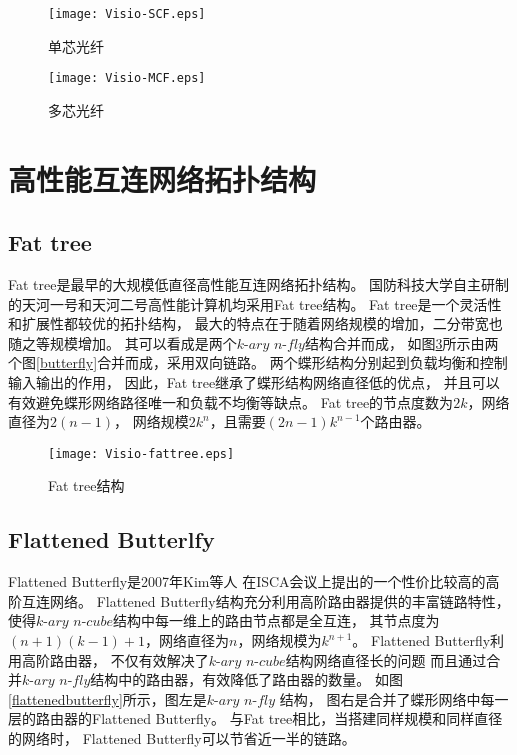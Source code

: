 \begin{figure}[htp]
  \centering
    \texttt{[image: Visio-SCF.eps]}
    \caption{单芯光纤}
    \label{scf}
\end{figure}

\begin{figure}[htp]
  \centering
    \texttt{[image: Visio-MCF.eps]}
      \caption{多芯光纤}
       \label{mcf}
\end{figure}

\section{高性能互连网络拓扑结构}

\subsection{Fat tree}
Fat tree是最早的大规模低直径高性能互连网络拓扑结构。
国防科技大学自主研制的天河一号和天河二号高性能计算机均采用Fat tree结构。
Fat tree是一个灵活性和扩展性都较优的拓扑结构，
最大的特点在于随着网络规模的增加，二分带宽也随之等规模增加。
其可以看成是两个$k\textrm{-}ary$ $n\textrm{-}fly$结构合并而成，
如图\ref{fattree}所示由两个图\ref{butterfly}合并而成，采用双向链路。
两个蝶形结构分别起到负载均衡和控制输入输出的作用，
因此，Fat tree继承了蝶形结构网络直径低的优点，
并且可以有效避免蝶形网络路径唯一和负载不均衡等缺点。
Fat tree的节点度数为$2k$，网络直径为$2(n-1)$，
网络规模$2k^n$，且需要$(2n-1)k^{n-1}$个路由器。
\begin{figure}[htp]
  \centering
    \texttt{[image: Visio-fattree.eps]}
    \caption{Fat tree结构}
     \label{fattree}
\end{figure}

\subsection{Flattened Butterlfy}

Flattened Butterfly是2007年Kim等人
在ISCA会议上提出的一个性价比较高的高阶互连网络。
Flattened Butterfly结构充分利用高阶路由器提供的丰富链路特性，
使得$k\textrm{-}ary$ $n\textrm{-}cube$结构中每一维上的路由节点都是全互连，
其节点度为$(n+1)(k-1)+1$，网络直径为$n$，网络规模为$k^{n+1}$。
Flattened Butterfly利用高阶路由器，
不仅有效解决了$k\textrm{-}ary$ $n\textrm{-}cube$结构网络直径长的问题
而且通过合并$k\textrm{-}ary$ $n\textrm{-}fly$结构中的路由器，有效降低了路由器的数量。
如图\ref{flattenedbutterfly}所示，图左是$k\textrm{-}ary$ $n\textrm{-}fly$ 结构，
图右是合并了蝶形网络中每一层的路由器的Flattened Butterfly。
与Fat tree相比，当搭建同样规模和同样直径的网络时，
Flattened Butterfly可以节省近一半的链路。

